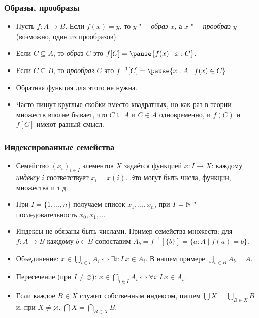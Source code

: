 \documentclass[10pt]{beamer}
\begin{document}
\begin{frame}
    \frametitle{Образы, прообразы}
    \begin{itemize}
        \item Пусть $f:A\to B$. Если $f(x) = y$, то $y$ "--- \emph{образ $x$}, а $x$ "--- \emph{прообраз $y$} (возможно, один из прообразов).
        \item Если $C \subseteq A$, то \emph{образ $C$} это $f[C] = \pause \{f(x) \mid x : C\}$.
        \pause
        \item Если $C \subseteq B$, то \emph{прообраз $C$} это $f^{-1}[C] = \pause \{x : A \mid f(x) \in C\}$.
        \item Обратная функция для этого не нужна.
        \item Часто пишут круглые скобки вместо квадратных, но как раз в теории множеств вполне бывает, что $C \subseteq A$ и $C \in A$ одновременно, и $f(C)$ и $f[C]$ имеют разный смысл.
    \end{itemize}
\end{frame}

\begin{frame}
    \frametitle{Индексированные семейства}
    \begin{itemize}
        \item Семейство $(x_i)_{i\in I}$ элементов $X$ задаётся функцией $x:I\to X$: каждому \emph{индексу} $i$ соответствует $x_i=x(i)$. Это могут быть числа, функции, множества и т.д.
        \item При $I=\{1,\ldots,n\}$ получаем список $x_1,\ldots,x_n$, при $I=\mathbb{N}$ "--- последовательность $x_0,x_1,\ldots$
        \pause
        \item Индексы не обязаны быть числами. Пример семейства множеств: для $f:A\to B$ каждому $b\in B$ сопоставим $A_b=f^{-1}[\{b\}]=\{a:A\mid f(a)=b\}$.
        \pause
        \item Объединение: $x\in\bigcup_{i\in I}A_i \iff \exists i:I~x\in A_i$. В нашем примере $\bigcup_{b\in B}A_b=A$.
        \item Пересечение (при $I\ne\varnothing$):
        $x\in\bigcap_{i\in I}A_i \iff \forall i:I~x\in A_i$.
        \pause
        \item Если каждое $B\in X$ служит собственным индексом, пишем $\bigcup X=\bigcup_{B\in X}B$ и, при $X\ne\varnothing$, $\bigcap X=\bigcap_{B\in X}B$.
    \end{itemize}
\end{frame}
\end{document}
